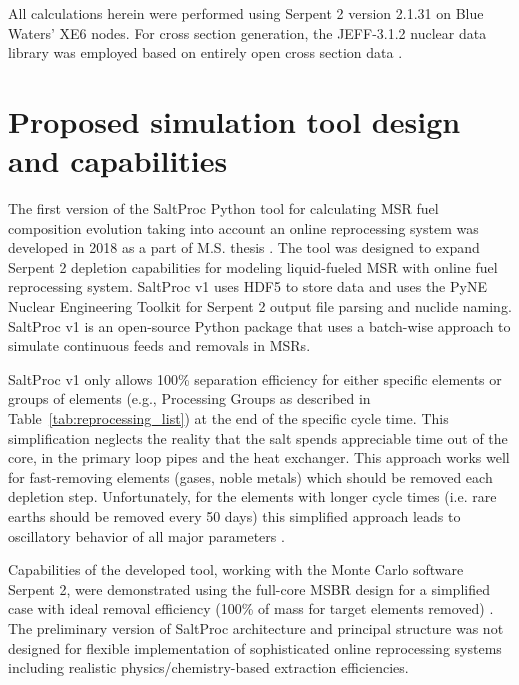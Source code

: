 All calculations herein were performed using Serpent 2 version 2.1.31 on Blue 
Waters’ XE6 nodes. For cross section generation, the JEFF-3.1.2 nuclear data 
library was employed based on entirely open cross section data 
\cite{oecd/nea_data_bank_jeff-3.1.2_2014}. 

\section{Proposed simulation tool design and capabilities} \label{sec:tool_design}
The first version of the SaltProc Python tool for calculating \gls{MSR} fuel 
composition evolution taking into account an online reprocessing system 
was developed in 2018 as a part of M.S. thesis \cite{rykhlevskii_advanced_2018,
	rykhlevskii_arfc/saltproc_2018}. The tool was designed to 
expand Serpent 2 depletion capabilities for modeling liquid-fueled \gls{MSR} 
with online fuel reprocessing system. SaltProc v1 uses HDF5 
\cite{the_hdf_group_hierarchical_1997} to store 
data and uses the PyNE Nuclear Engineering Toolkit \cite{scopatz_pyne_2012}
for Serpent 2 output file parsing and nuclide naming. SaltProc v1 is an 
open-source Python package that uses a batch-wise approach to simulate 
continuous feeds and removals in \glspl{MSR}. 

SaltProc v1 only allows 100\% separation efficiency for 
either specific elements or groups of elements (e.g., Processing Groups as 
described in 
Table~\ref{tab:reprocessing_list}) at the end of the specific cycle time. 
This simplification neglects the reality that the salt spends appreciable time 
out of the core, in the primary loop pipes and the heat exchanger. This 
approach 
works well for fast-removing elements (gases, noble metals) 
which should be removed each depletion step. Unfortunately, 
for the elements with longer cycle times (i.e. rare earths should be removed 
every 50 days) this simplified approach leads to oscillatory behavior of all
major parameters \cite{rykhlevskii_modeling_2019}. 

Capabilities of the developed tool, working with the Monte Carlo software 
Serpent 2, were demonstrated using the full-core MSBR design for a 
simplified case with ideal removal efficiency (100\% of mass for target 
elements removed) \cite{rykhlevskii_modeling_2019}. The preliminary version of 
SaltProc architecture and principal structure was not designed for 
flexible implementation of sophisticated online reprocessing systems 
including realistic physics/chemistry-based extraction efficiencies. 


